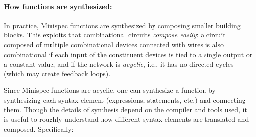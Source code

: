 \paragraph{How functions are synthesized:}
In practice, Minispec functions are synthesized by composing smaller building blocks.
This exploits that combinational circuits \emph{compose easily}:
a circuit composed of multiple combinational devices connected with wires is also combinational
if each input of the constituent devices is tied to a single output or a constant value,
and if the network is \emph{acyclic}, i.e., it has no directed cycles
(which may create feedback loops).

Since Minispec functions are acyclic, one can synthesize a function by synthesizing each syntax element
(expressions, statements, etc.) and connecting them.
Though the details of synthesis depend on the compiler and tools used,
it is useful to roughly understand how different syntax elements are translated and composed.
Specifically:
